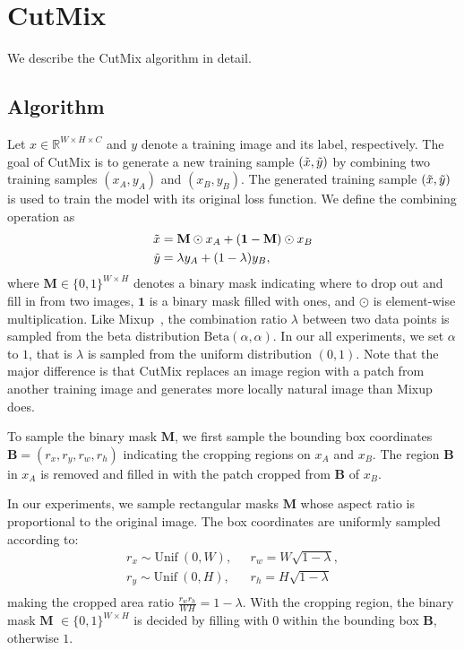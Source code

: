 

\section{CutMix}
\label{sec:cutmix}
\noindent
We describe the CutMix algorithm in detail. 

\subsection{Algorithm}
\label{sec:cutmix_algorithm}
Let $x \in \mathbb{R}^{W \times H \times C}$ and $y$ denote a training image and its label, respectively.
The goal of CutMix is to generate a new training sample $(\Tilde{x},\Tilde{y})$ by combining two training samples $(x_{A}, y_{A})$ and $(x_{B}, y_{B})$. 
{The generated} training sample $(\Tilde{x},\Tilde{y})$ is used to train the model {with} its original loss function.
{We define the combining operation as}
\begin{equation}
\begin{split}
    \Tilde{x} & =  \mathbf{M} \odot x_{A} + (\mathbf{1}- \mathbf{M}) \odot x_{B} \\
    \Tilde{y} & =  \lambda y_A + (1-\lambda) y_B, \\
\end{split}
\label{eq:cutmix}
\end{equation}
where $\mathbf{M} \in \{0,1\}^{W \times H}$ denotes a binary mask indicating where to drop out and fill in from two images, $\mathbf{1}$ is a binary mask filled with ones, and $\odot$ is element-wise multiplication.
Like Mixup~\cite{zhang2017mixup}, the combination ratio $\lambda$ between two data points is sampled from the beta distribution $\text{Beta}(\alpha,\alpha)$. 
In our all experiments, we set $\alpha$ to $1$, that is $\lambda$ is sampled from the uniform distribution $(0,1)$. 
Note that the major difference is that CutMix replaces an image region with a patch from another training image and generates {more locally natural image than Mixup does}.

To sample the binary mask $\mathbf{M}$, we first sample the bounding box coordinates $\mathbf{B}=(r_x,r_y,r_w,r_h)$ indicating the cropping regions on $x_A$ and $x_B$. 
The region $\mathbf{B}$ in $x_A$ is removed and filled in with the patch cropped from $\mathbf{B}$ of $x_B$. 


In our experiments, we sample rectangular masks $\mathbf{M}$ whose aspect ratio is proportional to the original image. The box coordinates are uniformly sampled according to:  
\begin{equation}
\begin{split}
    r_{x} \sim \text{Unif}~ \left(0, W\right), &~~~r_{w} = W \sqrt{1-\lambda},  \\
    r_{y} \sim \text{Unif}~ \left(0, H\right), &~~~r_{h} = H \sqrt{1-\lambda}  \\
\end{split}
\label{eq:sampling}
\end{equation}
making the cropped area ratio $\frac{r_w r_h}{WH} = 1-\lambda$.
With the cropping region, the binary mask $\mathbf{M}$ $\in \{0,1\}^{W \times H}$ is decided by filling with $0$ within the bounding box $\mathbf{B}$, otherwise $1$.

